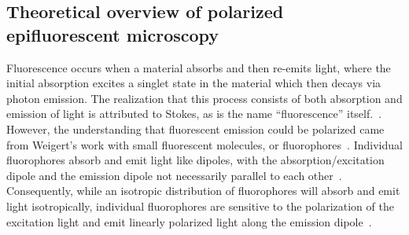 \subsection{Theoretical overview of polarized epifluorescent microscopy}
Fluorescence occurs when a material absorbs and then re-emits light, where the initial absorption excites a singlet state in the material which then decays via photon emission.
The realization that this process consists of both absorption and emission of light is attributed to Stokes, as is the name ``fluorescence'' itself.~\cite{RN286,RN287}.
However, the understanding that fluorescent emission could be polarized came from Weigert's work with small fluorescent molecules, or fluorophores~\cite{RN285}.
Individual fluorophores absorb and emit light like dipoles, with the absorption/excitation dipole and the emission dipole not necessarily parallel to each other~\cite{RN282}.
Consequently, while an isotropic distribution of fluorophores will absorb and emit light isotropically, individual fluorophores are sensitive to the polarization of the excitation light and emit linearly polarized light along the emission dipole~\cite{RN282}.

